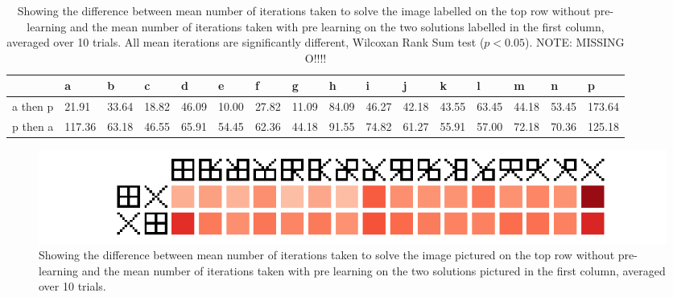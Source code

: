 \documentclass[runningheads,a4paper]{llncs}
\begin{document}
 \begin{table}[t!]
    \begin{tabular}{ | l | l | l | l | l | l | l | l | l | l | l | l | l| l| l| l|}
    \hline
    & a &b &c &d &e &f &g &h &i &j &k &l &m &n &p \\ \hline
    a then p & 21.91 & 33.64 & 18.82 & 46.09 & 10.00 & 27.82 & 11.09 & 84.09 & 46.27 & 42.18 & 43.55 & 63.45 & 44.18 & 53.45 & 173.64\\\hline
    p then a & 117.36 & 63.18 & 46.55 & 65.91 & 54.45 & 62.36 & 44.18 & 91.55 & 74.82 & 61.27 & 55.91 & 57.00 & 72.18 & 70.36 & 125.18\\\hline
    \end{tabular}
    \label{table:accumulation_results}
    \caption{Showing the difference between mean number of iterations taken to solve the image labelled on the top row without pre-learning and the mean number of iterations taken with pre learning on the two solutions labelled in the first column, averaged over 10 trials. All mean iterations are significantly different, Wilcoxan Rank Sum test (\(p<0.05\)). NOTE: MISSING O!!!!}
\end{table}

\begin{figure}[t!]
\center
\includegraphics[width = 1.0\textwidth]{images/boxy_square_cmap.png}

\caption{Showing the difference between mean number of iterations taken to solve the image pictured on the top row without pre-learning and the mean number of iterations taken with pre learning on the two solutions pictured in the first column, averaged over 10 trials.} 
\label{figure:cross_square_grid}
\end{figure}
\end{document}
